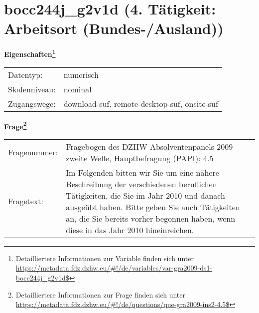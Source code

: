 
    \setcounter{footnote}{0}

    \vspace*{-1.8cm}
	\section{bocc244j\_g2v1d (4. Tätigkeit: Arbeitsort (Bundes-/Ausland))}
	\label{section:bocc244j_g2v1d}



    \vspace*{0.5cm}
    \noindent\textbf{Eigenschaften\footnote{Detailliertere Informationen zur Variable finden sich unter
		\url{https://metadata.fdz.dzhw.eu/\#!/de/variables/var-gra2009-ds1-bocc244j_g2v1d$}}}\\
	\begin{tabularx}{\hsize}{@{}lX}
	Datentyp: & numerisch \\
	Skalenniveau: & nominal \\
	Zugangswege: &
	  download-suf, 
	  remote-desktop-suf, 
	  onsite-suf
 \\
    \end{tabularx}



				\vspace*{0.5cm}
                \noindent\textbf{Frage\footnote{Detailliertere Informationen zur Frage finden sich unter
		              \url{https://metadata.fdz.dzhw.eu/\#!/de/questions/que-gra2009-ins2-4.5$}}}\\
				\begin{tabularx}{\hsize}{@{}lX}
					Fragenummer: &
					  Fragebogen des DZHW-Absolventenpanels 2009 - zweite Welle, Hauptbefragung (PAPI):
					  4.5
 \\
					Fragetext: & Im Folgenden bitten wir Sie um eine nähere Beschreibung der verschiedenen beruflichen Tätigkeiten, die Sie im Jahr 2010 und danach ausgeübt haben. Bitte geben Sie auch Tätigkeiten an, die Sie bereits vorher begonnen haben, wenn diese in das Jahr 2010 hineinreichen. \\
				\end{tabularx}





